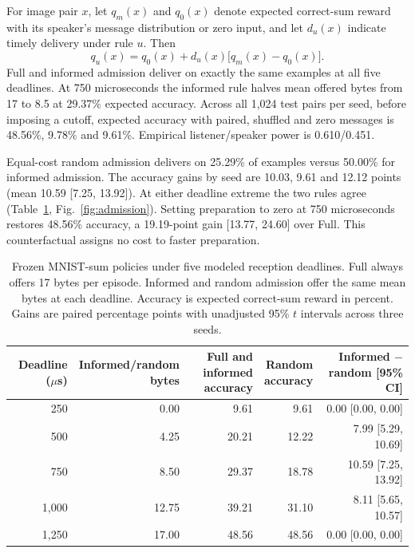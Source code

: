 \documentclass[pdflatex,sn-mathphys-num]{sn-jnl}
\begin{document}
For image pair $x$, let $q_m(x)$ and $q_0(x)$ denote expected correct-sum reward with its speaker's message distribution or zero input, and let $d_u(x)$ indicate timely delivery under rule $u$. Then
\begin{equation}
 q_u(x)=q_0(x)+d_u(x)\bigl[q_m(x)-q_0(x)\bigr].
 \label{eq:mnist_delivery}
\end{equation}
Full and informed admission deliver on exactly the same examples at all five deadlines. At 750 microseconds the informed rule halves mean offered bytes from 17 to 8.5 at 29.37\% expected accuracy. Across all 1,024 test pairs per seed, before imposing a cutoff, expected accuracy with paired, shuffled and zero messages is 48.56\%, 9.78\% and 9.61\%. Empirical listener/speaker power is 0.610/0.451.

Equal-cost random admission delivers on 25.29\% of examples versus 50.00\% for informed admission. The accuracy gains by seed are 10.03, 9.61 and 12.12 points (mean 10.59 [7.25, 13.92]). At either deadline extreme the two rules agree (Table~\ref{tab:external_deadlines}, Fig.~\ref{fig:admission}). Setting preparation to zero at 750 microseconds restores 48.56\% accuracy, a 19.19-point gain [13.77, 24.60] over Full. This counterfactual assigns no cost to faster preparation.
\begin{table}[htbp]\centering\normalsize
\caption{Frozen MNIST-sum policies under five modeled reception deadlines. Full always offers 17 bytes per episode. Informed and random admission offer the same mean bytes at each deadline. Accuracy is expected correct-sum reward in percent. Gains are paired percentage points with unadjusted 95\% $t$ intervals across three seeds.}\label{tab:external_deadlines}
{\footnotesize\setlength{\tabcolsep}{1.3pt}\begin{tabular}{rrrrr}\toprule
Deadline ($\mu$s) & \shortstack[r]{Informed/random\\bytes} & \shortstack[r]{Full and informed\\accuracy} & \shortstack[r]{Random\\accuracy} & \shortstack[r]{Informed $-$ random\\{[95\% CI]}}\\\midrule
250 & 0.00 & 9.61 & 9.61 & 0.00 [0.00, 0.00]\\
500 & 4.25 & 20.21 & 12.22 & 7.99 [5.29, 10.69]\\
750 & 8.50 & 29.37 & 18.78 & 10.59 [7.25, 13.92]\\
1,000 & 12.75 & 39.21 & 31.10 & 8.11 [5.65, 10.57]\\
1,250 & 17.00 & 48.56 & 48.56 & 0.00 [0.00, 0.00]\\
\bottomrule\end{tabular}}\end{table}
\end{document}
